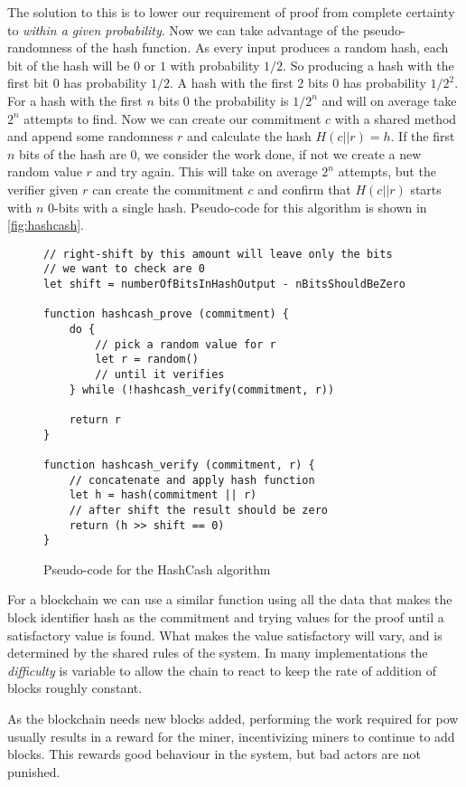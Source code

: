 The solution to this is to lower our requirement of proof from complete certainty to \emph{within a given probability}. Now we can take advantage of the pseudo-randomness of the hash function. As every input produces a random hash, each bit of the hash will be $0$ or $1$ with probability $1/2$. So producing a hash with the first bit $0$ has probability $1/2$. A hash with the first 2 bits $0$ has probability $1/2^2$. For a hash with the first $n$ bits $0$ the probability is $1/2^n$ and will on average take $2^n$ attempts to find. Now we can create our commitment $c$ with a shared method and append some randomness $r$ and calculate the hash $H(c || r) = h$. If the first $n$ bits of the hash are 0, we consider the work done, if not we create a new random value $r$ and try again. This will take on average $2^n$ attempts, but the verifier given $r$ can create the commitment $c$ and confirm that $H(c || r)$ starts with $n$ 0-bits with a single hash. Pseudo-code for this algorithm is shown in \autoref{fig:hashcash}.

\begin{figure}[h]
    \centering
    \begin{lstlisting}[style=ES6, language=ES6]
// right-shift by this amount will leave only the bits
// we want to check are 0
let shift = numberOfBitsInHashOutput - nBitsShouldBeZero

function hashcash_prove (commitment) {
    do {
        // pick a random value for r
        let r = random()
        // until it verifies
    } while (!hashcash_verify(commitment, r))

    return r
}

function hashcash_verify (commitment, r) {
    // concatenate and apply hash function
    let h = hash(commitment || r)
    // after shift the result should be zero
    return (h >> shift == 0)
}
        \end{lstlisting}
    \caption{Pseudo-code for the HashCash algorithm}
    \label{fig:hashcash}
\end{figure}

For a blockchain we can use a similar function using all the data that makes the block identifier hash as the commitment and trying values for the proof until a satisfactory value is found. What makes the value satisfactory will vary, and is determined by the shared rules of the system. In many implementations the \emph{difficulty} is variable to allow the chain to react to keep the rate of addition of blocks roughly constant.

As the blockchain needs new blocks added, performing the work required for \gls{pow} usually results in a reward for the miner, incentivizing miners to continue to add blocks. This rewards good behaviour in the system, but bad actors are not punished.

